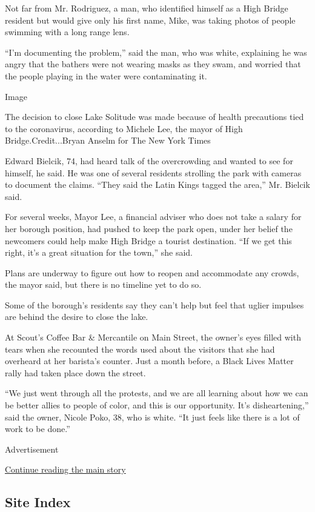 Not far from Mr. Rodriguez, a man, who identified himself as a High
Bridge resident but would give only his first name, Mike, was taking
photos of people swimming with a long range lens.

``I'm documenting the problem,'' said the man, who was white, explaining
he was angry that the bathers were not wearing masks as they swam, and
worried that the people playing in the water were contaminating it.

Image

The decision to close Lake Solitude was made because of health
precautions tied to the coronavirus, according to Michele Lee, the mayor
of High Bridge.Credit...Bryan Anselm for The New York Times

Edward Bielcik, 74, had heard talk of the overcrowding and wanted to see
for himself, he said. He was one of several residents strolling the park
with cameras to document the claims. ``They said the Latin Kings tagged
the area,'' Mr. Bielcik said.

For several weeks, Mayor Lee, a financial adviser who does not take a
salary for her borough position, had pushed to keep the park open, under
her belief the newcomers could help make High Bridge a tourist
destination. ``If we get this right, it's a great situation for the
town,'' she said.

Plans are underway to figure out how to reopen and accommodate any
crowds, the mayor said, but there is no timeline yet to do so.

Some of the borough's residents say they can't help but feel that uglier
impulses are behind the desire to close the lake.

At Scout's Coffee Bar \& Mercantile on Main Street, the owner's eyes
filled with tears when she recounted the words used about the visitors
that she had overheard at her barista's counter. Just a month before, a
Black Lives Matter rally had taken place down the street.

``We just went through all the protests, and we are all learning about
how we can be better allies to people of color, and this is our
opportunity. It's disheartening,'' said the owner, Nicole Poko, 38, who
is white. ``It just feels like there is a lot of work to be done.''

Advertisement

\protect\hyperlink{after-bottom}{Continue reading the main story}

\hypertarget{site-index}{%
\subsection{Site Index}\label{site-index}}

